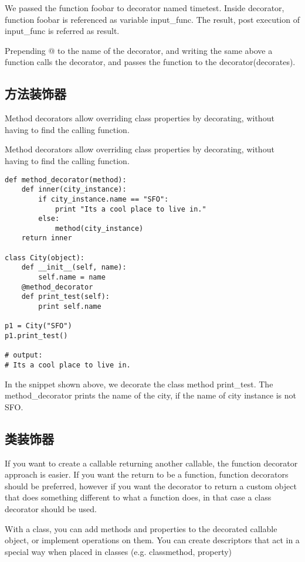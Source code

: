 We passed the function foobar to decorator named timetest. Inside decorator, function foobar is referenced as variable input\_func. The result, post execution of input\_func is referred as result.

Prepending @ to the name of the decorator, and writing the same above a function calls the decorator, and passes the function to the decorator(decorates).

\subsection{方法装饰器}
Method decorators allow overriding class properties by decorating, without having to find the calling function.

Method decorators allow overriding class properties by decorating, without having to find the calling function.
\begin{verbatim}
def method_decorator(method):
    def inner(city_instance):
        if city_instance.name == "SFO":
            print "Its a cool place to live in."
        else:
            method(city_instance)
    return inner

class City(object):
    def __init__(self, name):
        self.name = name
    @method_decorator
    def print_test(self):
        print self.name

p1 = City("SFO")
p1.print_test()

# output:
# Its a cool place to live in.
\end{verbatim}

In the snippet shown above, we decorate the class method print\_test. The method\_decorator prints the name of the city, if the name of city instance is not SFO.

\subsection{类装饰器}
If you want to create a callable returning another callable, the function decorator approach is easier. If you want the return to be a function, function decorators should be preferred, however if you want the decorator to return a custom object that does something different to what a function does, in that case a class decorator should be used.

With a class, you can add methods and properties to the decorated callable object, or implement operations on them. You can create descriptors that act in a special way when placed in classes (e.g. classmethod, property)

